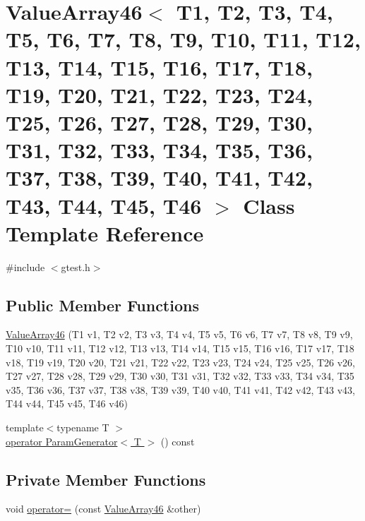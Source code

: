 \hypertarget{classtesting_1_1internal_1_1ValueArray46}{\section{\-Value\-Array46$<$ \-T1, \-T2, \-T3, \-T4, \-T5, \-T6, \-T7, \-T8, \-T9, \-T10, \-T11, \-T12, \-T13, \-T14, \-T15, \-T16, \-T17, \-T18, \-T19, \-T20, \-T21, \-T22, \-T23, \-T24, \-T25, \-T26, \-T27, \-T28, \-T29, \-T30, \-T31, \-T32, \-T33, \-T34, \-T35, \-T36, \-T37, \-T38, \-T39, \-T40, \-T41, \-T42, \-T43, \-T44, \-T45, \-T46 $>$ \-Class \-Template \-Reference}
\label{d5/dac/classtesting_1_1internal_1_1ValueArray46}
}


{\ttfamily \#include $<$gtest.\-h$>$}

\subsection*{\-Public \-Member \-Functions}
\begin{DoxyCompactItemize}
\item 
\hyperlink{classtesting_1_1internal_1_1ValueArray46_afcaa93628aeaf4917482a3c777e409ef}{\-Value\-Array46} (\-T1 v1, \-T2 v2, \-T3 v3, \-T4 v4, \-T5 v5, \-T6 v6, \-T7 v7, \-T8 v8, \-T9 v9, \-T10 v10, \-T11 v11, \-T12 v12, \-T13 v13, \-T14 v14, \-T15 v15, \-T16 v16, \-T17 v17, \-T18 v18, \-T19 v19, \-T20 v20, \-T21 v21, \-T22 v22, \-T23 v23, \-T24 v24, \-T25 v25, \-T26 v26, \-T27 v27, \-T28 v28, \-T29 v29, \-T30 v30, \-T31 v31, \-T32 v32, \-T33 v33, \-T34 v34, \-T35 v35, \-T36 v36, \-T37 v37, \-T38 v38, \-T39 v39, \-T40 v40, \-T41 v41, \-T42 v42, \-T43 v43, \-T44 v44, \-T45 v45, \-T46 v46)
\item 
{\footnotesize template$<$typename T $>$ }\\\hyperlink{classtesting_1_1internal_1_1ValueArray46_a08ef46fa12c9dd8ef6fc630baeea89b7}{operator Param\-Generator$<$ T $>$} () const 
\end{DoxyCompactItemize}
\subsection*{\-Private \-Member \-Functions}
\begin{DoxyCompactItemize}
\item 
void \hyperlink{classtesting_1_1internal_1_1ValueArray46_ae39c95ae4ae29974562f00c74930b607}{operator=} (const \hyperlink{classtesting_1_1internal_1_1ValueArray46}{\-Value\-Array46} \&other)
\end{DoxyCompactItemize}
